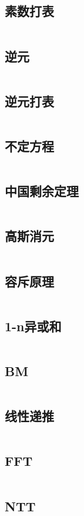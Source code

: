 \documentclass[a4paper,6pt]{article}
\begin{document}
\subsection{素数打表}
\inputminted[breaklines]{c++}{math/prime-table.cpp}
\subsection{逆元}
\inputminted[breaklines]{c++}{math/inverse.cpp}
\subsection{逆元打表}
\inputminted[breaklines]{c++}{math/all-inverse.cpp}
\subsection{不定方程}
\inputminted[breaklines]{c++}{math/indeterminate-equation.cpp}
\subsection{中国剩余定理}
\inputminted[breaklines]{c++}{math/CRT.cpp}
\subsection{高斯消元}
\inputminted[breaklines]{c++}{math/Gauss-elim.cpp}
\subsection{容斥原理}
\inputminted[breaklines]{c++}{math/inclusion-exclusion.cpp}
\subsection{1-n异或和}
\inputminted[breaklines]{c++}{math/xor_n.cpp}
\subsection{BM}
\inputminted[breaklines]{c++}{math/Berlekamp-Massey.cpp}
\subsection{线性递推}
\inputminted[breaklines]{c++}{math/Linear_Seq.cpp}
\subsection{FFT}
\inputminted[breaklines]{c++}{math/fft.cpp}
\subsection{NTT}
\inputminted[breaklines]{c++}{math/ntt.cpp}
\end{document}
